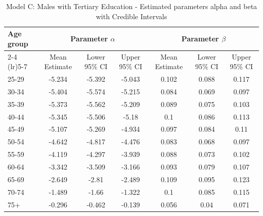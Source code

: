 \begin{landscape}
\begin{table}[htbp]
\centering
\caption{Model C: Males with Tertiary Education - Estimated parameters alpha and beta  with Credible Intervals}
\label{tab:parameters_ab24}
\begin{tabular}{@{}lcccccc@{}}
\toprule
Age group & \multicolumn{3}{c}{Parameter \(\alpha\)} & \multicolumn{3}{c}{Parameter \(\beta\)} \\ 
\cmidrule(lr){2-4} \cmidrule(lr){5-7}
          & Mean Estimate & Lower 95\% CI & Upper 95\% CI & Mean Estimate & Lower 95\% CI & Upper 95\% CI \\ 
\midrule
25-29 & -5.234 & -5.392 & -5.043 & 0.102 & 0.088 & 0.117 \\
30-34 & -5.404 & -5.574 & -5.215 & 0.084 & 0.069 & 0.097 \\
35-39 & -5.373 & -5.562 & -5.209 & 0.089 & 0.075 & 0.103 \\
40-44 & -5.345 & -5.506 & -5.18 & 0.1 & 0.086 & 0.113 \\
45-49 & -5.107 & -5.269 & -4.934 & 0.097 & 0.084 & 0.11 \\
50-54 & -4.642 & -4.817 & -4.476 & 0.083 & 0.068 & 0.097 \\
55-59 & -4.119 & -4.297 & -3.939 & 0.088 & 0.073 & 0.102 \\
60-64 & -3.342 & -3.509 & -3.166 & 0.093 & 0.079 & 0.107 \\
65-69 & -2.649 & -2.81 & -2.489 & 0.109 & 0.095 & 0.123 \\
70-74 & -1.489 & -1.66 & -1.322 & 0.1 & 0.085 & 0.115 \\
75+ & -0.296 & -0.462 & -0.139 & 0.056 & 0.04 & 0.071 \\
\bottomrule
\end{tabular}
\end{table}
\end{landscape}